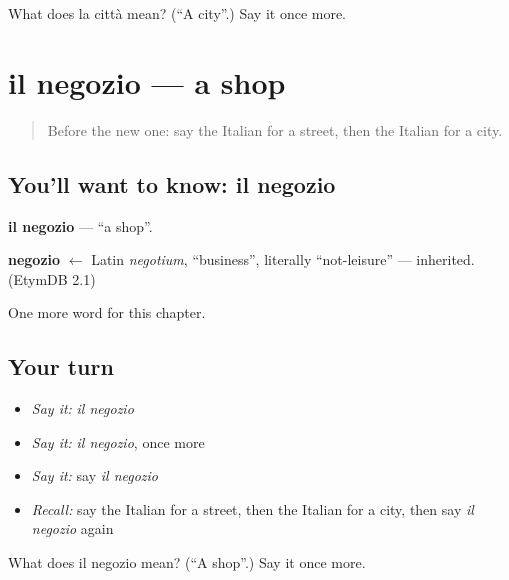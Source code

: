 \begin{tcolorbox}[breakable,colback=teal!4,colframe=teal!35!black,title={Before you move on}]
What does la città mean? (\textquotedblleft{}A city\textquotedblright{}.) Say it once more.
\end{tcolorbox}
\section[il negozio]{il negozio — a shop}

\label{lesson:IT-C81-negozio}



\begin{quote}
Before the new one: say the Italian for a street, then the Italian for a city.
\end{quote}

\subsection*{You'll want to know: il negozio}
\textbf{il negozio} — \textquotedblleft{}a shop\textquotedblright{}.

\begin{cousinweb}
\textbf{negozio} $\leftarrow$ Latin \emph{negotium}, \textquotedblleft{}business\textquotedblright{}, literally \textquotedblleft{}not-leisure\textquotedblright{} — inherited. (EtymDB 2.1)
\end{cousinweb}

\begin{grammarlens}[title={What you've built}]
One more word for this chapter.
\end{grammarlens}

\subsection*{Your turn}
\begin{itemize}
\raggedright
  \item \emph{Say it:} \emph{il negozio}
  \item \emph{Say it:} \emph{il negozio}, once more
  \item \emph{Say it:} say \emph{il negozio}
  \item \emph{Recall:} say the Italian for a street, then the Italian for a city, then say \emph{il negozio} again
\end{itemize}

\begin{tcolorbox}[breakable,colback=teal!4,colframe=teal!35!black,title={Before you move on}]
What does il negozio mean? (\textquotedblleft{}A shop\textquotedblright{}.) Say it once more.
\end{tcolorbox}
